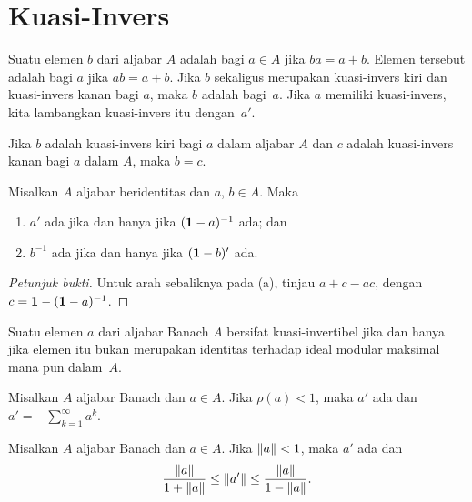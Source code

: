 \section{Kuasi-Invers}
\begin{defn} Suatu elemen $b$ dari aljabar $A$ adalah  bagi $a \in A$ jika
$ba = a + b$. Elemen tersebut adalah  bagi $a$ jika $ab = a + b$. Jika $b$
sekaligus merupakan kuasi-invers kiri dan kuasi-invers kanan bagi $a$, maka $b$ adalah
 bagi~$a$. Jika $a$ memiliki kuasi-invers, kita lambangkan kuasi-invers itu dengan~$a'$.
\end{defn}

\begin{prop} Jika $b$ adalah kuasi-invers kiri bagi $a$ dalam aljabar $A$ dan $c$ adalah
kuasi-invers kanan bagi $a$ dalam $A$, maka $b = c$.
\end{prop}

\begin{prop} Misalkan $A$ aljabar beridentitas dan $a$, $b \in A$. Maka
 \begin{enumerate}
  \item[(a)] $a'$ ada jika dan hanya jika $(\mathbf{1} - a)^{-1}$ ada; dan
  \item[(b)] $b^{-1}$ ada jika dan hanya jika $(\mathbf{1} - b)'$ ada.
 \end{enumerate}
\end{prop}

\begin{proof}[\emph{Petunjuk bukti}] Untuk arah sebaliknya pada (a), tinjau
$a + c - ac$, dengan $c = \mathbf{1} - (\mathbf{1} - a)^{-1}$. \ns
\end{proof}

\begin{prop} Suatu elemen $a$ dari aljabar Banach $A$ bersifat kuasi-invertibel jika dan hanya jika
elemen itu bukan merupakan identitas terhadap ideal modular maksimal mana pun dalam~$A$.
\end{prop}

\begin{prop} Misalkan $A$ aljabar Banach dan $a \in A$. Jika $\rho(a) < 1$, maka $a'$ ada
dan $a' = -\sum_{k=1}^\infty a^k$.
\end{prop}

\begin{prop} Misalkan $A$ aljabar Banach dan $a \in A$. Jika $\lVert a\rVert < 1$, maka $a'$ ada
dan
   \[ \frac{\lVert a\rVert}{1 + \lVert a\rVert} \le \lVert a'\rVert \le \frac{\lVert a\rVert}{1 - \lVert a\rVert}. \]
\end{prop}

